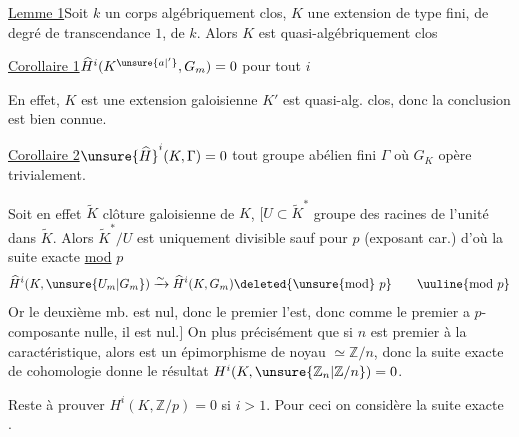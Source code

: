 
\uline{Lemme 1}\quad Soit $k$ un corps algébriquement clos, $K$ une extension de type fini, de degré de transcendance $1$, de $k$. Alors $K$ est  quasi-algébriquement clos

\uline{Corollaire 1}\quad $\widehat H^i(K^{\unsure{a|'}},G_m)=0$ pour tout $i$

En effet, $K$ est une extension galoisienne  $K'$ est quasi-alg. clos, donc  la conclusion est bien connue.

\uline{Corollaire 2}\quad $\unsure{\widehat H}^i(K,\Gamma)=0$   tout groupe abélien fini $\Gamma$ où $G_K$ opère trivialement.

Soit en effet $\widetilde K$   clôture galoisienne de $K$,
$[U\subset\widetilde K^*$  groupe des racines de l'unité dans $\widetilde K$.
Alors $\widetilde K^*/U$ est uniquement divisible sauf pour $p$ (exposant car.) d'où la suite exacte \uline{mod} $p$
\[
\widehat H^i(K,\unsure{U_m|G_m})\xrightarrow{\sim}\widehat H^i(K,G_m)\deleted{\text{\unsure{mod}}\ p}\qquad\uuline{\text{mod }p}
\]
Or le  deuxième mb. est nul, donc le premier l'est, donc comme le premier  a $p$-composante nulle, il est nul.$]$
On   plus précisément que si $n$ est premier à la caractéristique, alors
est un épimorphisme de  noyau $\simeq\mathbb Z/n$, donc la suite exacte de cohomologie donne le résultat $H^i(K,\unsure{\mathbb Z_n|\mathbb Z/n})=0$.

Reste à prouver $H^i(K,\mathbb Z/p)=0$ si $i>1$. Pour ceci
on considère la suite exacte
.



